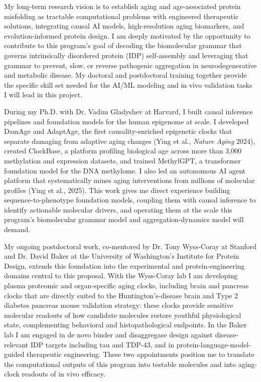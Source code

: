 \documentclass{nihbiosketch}
\begin{document}
\begin{statement}

My long-term research vision is to establish aging and age-associated protein misfolding as tractable computational problems with engineered therapeutic solutions, integrating causal AI models, high-resolution aging biomarkers, and evolution-informed protein design. I am deeply motivated by the opportunity to contribute to this program's goal of decoding the biomolecular grammar that governs intrinsically disordered protein (IDP) self-assembly and leveraging that grammar to prevent, slow, or reverse pathogenic aggregation in neurodegenerative and metabolic disease. My doctoral and postdoctoral training together provide the specific skill set needed for the AI/ML modeling and in vivo validation tasks I will lead in this project.

During my Ph.D. with Dr. Vadim Gladyshev at Harvard, I built causal inference pipelines and foundation models for the human epigenome at scale. I developed DamAge and AdaptAge, the first causality-enriched epigenetic clocks that separate damaging from adaptive aging changes (Ying et al., \textit{Nature Aging} 2024), created ClockBase, a platform profiling biological age across more than 3,000 methylation and expression datasets, and trained MethylGPT, a transformer foundation model for the DNA methylome. I also led an autonomous AI agent platform that systematically mines aging interventions from millions of molecular profiles (Ying et al., 2025). This work gives me direct experience building sequence-to-phenotype foundation models, coupling them with causal inference to identify actionable molecular drivers, and operating them at the scale this program's biomolecular grammar model and aggregation-dynamics model will demand.

My ongoing postdoctoral work, co-mentored by Dr. Tony Wyss-Coray at Stanford and Dr. David Baker at the University of Washington's Institute for Protein Design, extends this foundation into the experimental and protein-engineering domains central to this proposal. With the Wyss-Coray lab I am developing plasma proteomic and organ-specific aging clocks, including brain and pancreas clocks that are directly suited to the Huntington's-disease brain and Type 2 diabetes pancreas mouse validation strategy: these clocks provide sensitive molecular readouts of how candidate molecules restore youthful physiological state, complementing behavioral and histopathological endpoints. In the Baker lab I am engaged in de novo binder and disaggregase design against disease-relevant IDP targets including tau and TDP-43, and in protein-language-model-guided therapeutic engineering. These two appointments position me to translate the computational outputs of this program into testable molecules and into aging-clock readouts of in vivo efficacy.


\end{statement}
\end{document}
